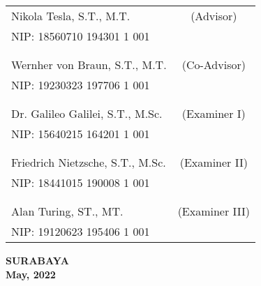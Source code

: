 \noindent
\begin{tabularx}{\textwidth}{X c}
  Nikola Tesla, S.T., M.T.         & (Advisor)      \\
  NIP: 18560710 194301 1 001       &                \\
                                   &                \\
                                   &                \\
  Wernher von Braun, S.T., M.T.    & (Co-Advisor)   \\
  NIP: 19230323 197706 1 001       &                \\
                                   &                \\
                                   &                \\
  Dr. Galileo Galilei, S.T., M.Sc. & (Examiner I)   \\
  NIP: 15640215 164201 1 001       &                \\
                                   &                \\
                                   &                \\
  Friedrich Nietzsche, S.T., M.Sc. & (Examiner II)  \\
  NIP: 18441015 190008 1 001       &                \\
                                   &                \\
                                   &                \\
  Alan Turing, ST., MT.            & (Examiner III) \\
  NIP: 19120623 195406 1 001       &                \\
\end{tabularx}
\endgroup

\vspace{4ex}

\begin{center}
  \textbf{SURABAYA} \\
  \textbf{May, 2022}
\end{center}
\endgroup
